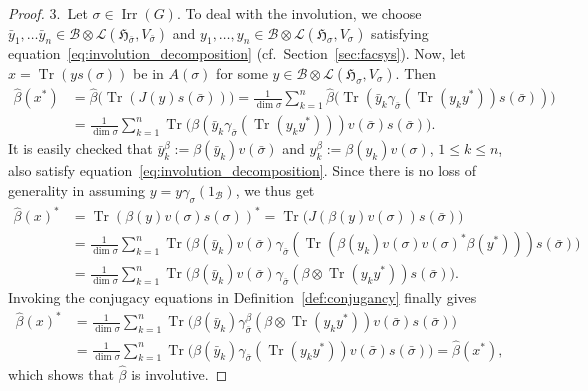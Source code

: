 \documentclass[10pt,a4paper]{amsart}
\numberwithin{equation}{section}
\newcommand*{\tensor}{\otimes}		%
\DeclareMathOperator{\Tr}{Tr}		%
\newcommand*{\hilb}{\mathfrak}		%
\newcommand*{\alg}{\mathcal}		%
\newcommand*{\hH}{\hilb{H}}			%
\newcommand*{\one}{1}				%
\newcommand*{\aB}{\alg{B}} 			%
\newcommand*{\End}{\mathcal{L}} %
\DeclareMathOperator{\Irrep}{Irr} 			%
\begin{document}
\begin{proof}
3.~Let $\sigma \in \Irrep(G)$.
		To deal with the involution, we choose $\bar y_1, \dots \bar y_n \in \aB \tensor \End(\hH_{\bar\sigma}, V_{\bar\sigma})$ and $y_1, \dots, y_n \in \aB \tensor \End(\hH_\sigma, V_\sigma)$ satisfying equation~\eqref{eq:involution_decomposition} (cf.~Section~\ref{sec:facsys}).
		Now, let $x = \Tr ( y s(\sigma) )$ be in $A(\sigma)$ for some $y \in \aB \tensor \End(\hH_\sigma, V_\sigma)$.
		Then
		\begin{align*}
			\hat\beta(x^*)
			&= \hat\beta \bigl( \Tr ( J(y) s(\bar \sigma) ) \bigr)
			= \frac{1}{\dim \sigma} \sum_{k=1}^n \hat\beta \bigl( \Tr ( \bar y_k \gamma_{\bar\sigma} (\Tr(y_k y^*) ) s(\bar \sigma) ) \bigr)
			\\
			&=
			\frac{1}{\dim \sigma} \sum_{k=1}^n \Tr \bigl( \beta ( \bar y_k \gamma_{\bar \sigma} ( \Tr(y_k y^*) ) ) v(\bar \sigma) s(\bar\sigma) \bigr).
		\end{align*}
		It is easily checked that $\bar y_k^\beta := \beta(\bar y_k) v(\bar\sigma)$ and $y_k^\beta := \beta(y_k)v(\sigma)$, $1 \le k \le n$, also satisfy equation~\eqref{eq:involution_decomposition}.
		Since there is no loss of generality in assuming $y = y \gamma_\sigma(\one_\aB)$, we thus get
		\begin{align*}
			\hat\beta(x)^*
			&= \Tr ( \beta(y) v(\sigma) s(\sigma) )^*
			= \Tr \bigl( J ( \beta(y) v(\sigma) ) s(\bar\sigma) \bigr)
			\\
			&=
			\frac{1}{\dim \sigma} \sum_{k=1}^n \Tr \bigl( \beta(\bar y_k) v(\bar\sigma) \gamma_{\bar\sigma} ( \Tr ( \beta(y_k) v(\sigma) v(\sigma)^* \beta(y^*) ) ) s(\bar \sigma) \bigr)
			\\
			&=
			\frac{1}{\dim \sigma} \sum_{k=1}^n \Tr \bigl( \beta(\bar y_k) v(\bar\sigma) \gamma_{\bar\sigma} ( \beta \tensor \Tr( y_k y^*) ) s(\bar \sigma) \bigr).
		\end{align*}
		Invoking the conjugacy equations in Definition~\ref{def:conjugancy} finally gives
		\begin{align*}
			\hat\beta(x)^*
			&=
			\frac{1}{\dim \sigma} \sum_{k=1}^n \Tr \bigl( \beta(\bar y_k) \gamma^\beta_{\bar\sigma} ( \beta \tensor \Tr( y_k y^*) ) v(\bar\sigma) s(\bar \sigma) \bigr)
			\\
			&=
			\frac{1}{\dim \sigma} \sum_{k=1}^n \Tr \bigl( \beta ( \bar y_k) \gamma_{\bar\sigma}( \Tr( y_k y^*) ) v(\bar\sigma) s(\bar \sigma)\bigr)
			= \hat\beta(x^*),
		\end{align*}
		which shows that $\hat \beta$ is involutive.
\end{proof}
\end{document}
